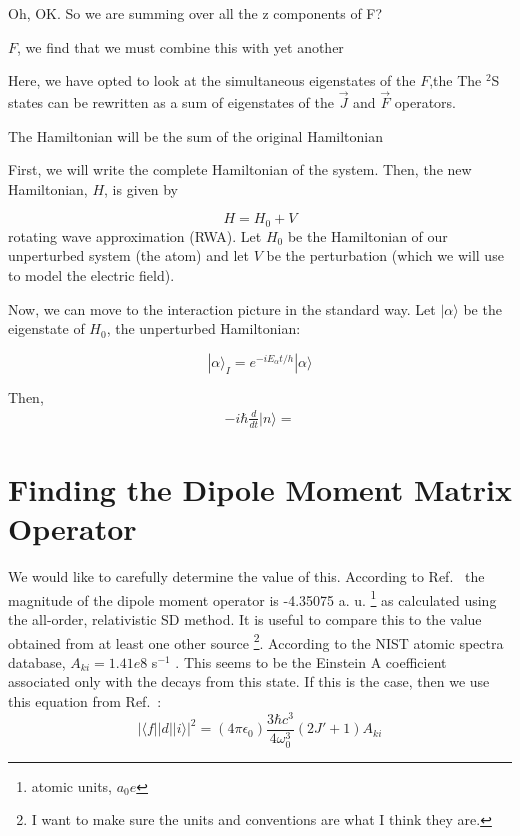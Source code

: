 
Oh, OK. So we are summing over all the z components of F?


$F$, we find that we must combine this with yet another 

Here, we have opted to look at the simultaneous eigenstates of the $F$,the The $^2$S states can be rewritten as a sum of eigenstates of the $\vec{J}$ and $\vec{F}$ operators. 


The Hamiltonian will be the sum of the original Hamiltonian 

First, we will write the complete Hamiltonian of the system.
Then, the new Hamiltonian, $H$, is given by 

\begin{equation}
H=H_0+V
\end{equation}
rotating wave approximation (RWA). Let $H_0$ be the Hamiltonian of our unperturbed system (the atom) and let $V$ be the perturbation (which we will use to model the electric field). 


Now, we can move to the interaction picture in the standard way. Let $|\alpha\rangle$ be the eigenstate of $H_0$, the unperturbed Hamiltonian: 

\begin{equation}
|\alpha\rangle_I=e^{-iE_\alpha t/h}|\alpha\rangle
\end{equation}

Then, 
\begin{align}
-i\hbar \frac{d}{dt}|n\rangle = 
\end{align}

\section{Finding the Dipole Moment Matrix Operator}
We would like to carefully determine the value of this. According to Ref.\ \cite{safronova2photon} the magnitude of the dipole moment operator is -4.35075 a. u. \footnote{atomic units, $a_0 e$} as calculated using the all-order, relativistic SD method. It is useful to compare this to the value obtained from at least one other source \footnote{I want to make sure the units and conventions are what I think they are.}. According to the NIST atomic spectra database, $A_{ki}=1.41e8$ s$^{-1}$ \cite{NISTasd}. This seems to be the Einstein A coefficient associated only with the decays from this state. If this is the case, then we use this equation from Ref.\ \cite{demilleBudkerKimball}:  
\begin{equation}
|\langle f ||d|| i \rangle|^2 = (4 \pi \epsilon_0) \frac{3 \hbar c^3}{4 \omega_0^3} (2 J'+1) A_{ki}\label{budkerAeqn} 
\end{equation}

